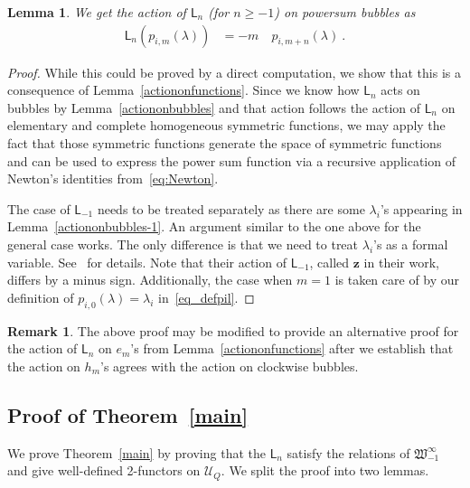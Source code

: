 \documentclass{amsart}
\numberwithin{equation}{section}
\newtheorem{lemma}[thm]{Lemma}
\theoremstyle{definition}
\newtheorem{remark}[thm]{Remark}
\newcommand{\Ucat}{\mathcal{U}_Q}
\newcommand{\witt}{{\mathfrak{W}}}
\newcommand{\LLn}[1][n]{{\mathsf{L}_{#1}}}
\newcommand{\ourwitt}{{\witt_{-1}^{\infty}}}
\begin{document}
\begin{lemma}
    We get the action of $\LLn[n]$ (for $n \geq -1$)  on powersum bubbles as 
\begin{align*}
    \LLn[n]\left(p_{i,m}(\lambda) \right) &= -m \quad p_{i,m+n}(\lambda)~.
\end{align*}
 
\end{lemma}
\begin{proof}
    While this could be proved by a direct computation, we show that this is a consequence of Lemma~\ref{actiononfunctions}. Since we know how $\LLn[n]$ acts on bubbles by Lemma~\ref{actiononbubbles} and that action follows the action of $\LLn[n]$ on elementary and complete homogeneous symmetric functions, we may apply the fact that those symmetric functions generate the space of symmetric functions and can be used to express the power sum function via a recursive application of Newton's identities from~\eqref{eq:Newton}.

    The case of $\LLn[-1]$ needs to be treated separately as there are some $\lambda_i$'s appearing in Lemma~\ref{actiononbubbles-1}. An argument similar to the one above for the general case works. The only difference is that we need to treat $\lambda_i$'s as a formal variable. See~\cite[Lemma 6.7]{Elias_2023} for details. Note that their action of $\LLn[-1]$, called $\mathbf{z}$ in their work, differs by a minus sign. Additionally, the case when $m = 1$ is taken care of by our definition of $p_{i,0}(\lambda) = \lambda_i$ in~\eqref{eq_defpil}.
\end{proof}

\begin{remark}
    The above proof may be modified to provide an alternative proof for the action of $\LLn[n]$ on $e_m$'s from Lemma~\ref{actiononfunctions} after we establish that the action on $h_m$'s agrees with the action on clockwise bubbles.
\end{remark}

\subsection{Proof of Theorem~\ref{main}}
We prove Theorem~\ref{main} by proving that the $\LLn$ satisfy the relations of $\ourwitt$ and give well-defined 2-functors on $\Ucat$. We split the proof into two lemmas.
\end{document}
